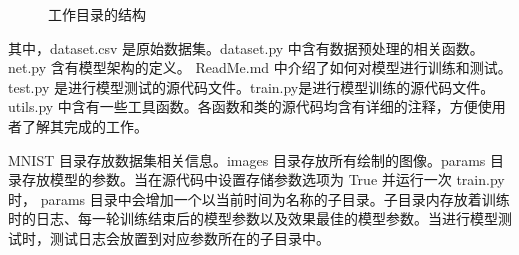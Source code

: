 \documentclass[supercite]{Experimental_Report}
\theoremstyle{definition}
\begin{document}
\begin{figure}[H]
\begin{center}
		\caption{工作目录的结构}
	\end{center}
\end{figure}

其中，dataset.csv 是原始数据集。dataset.py 中含有数据预处理的相关函数。net.py 含有模型架构的定义。
ReadMe.md 中介绍了如何对模型进行训练和测试。test.py 是进行模型测试的源代码文件。train.py是进行模型训练的源代码文件。
utils.py 中含有一些工具函数。各函数和类的源代码均含有详细的注释，方便使用者了解其完成的工作。

MNIST 目录存放数据集相关信息。images 目录存放所有绘制的图像。params 目录存放模型的参数。当在源代码中设置存储参数选项为 True 并运行一次 train.py 时，
params 目录中会增加一个以当前时间为名称的子目录。子目录内存放着训练时的日志、每一轮训练结束后的模型参数以及效果最佳的模型参数。当进行模型测试时，测试日志会放置到对应参数所在的子目录中。
\end{document}
